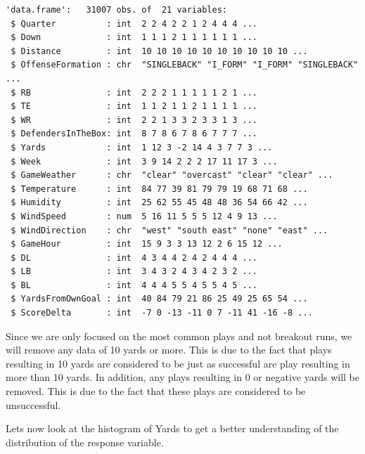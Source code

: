 \documentclass[
  super,
  preprint,
  3p]{elsarticle}
\newenvironment{Shaded}{\begin{snugshade}}{\end{snugshade}}
\newcommand{\CommentTok}[1]{\textcolor[rgb]{0.37,0.37,0.37}{#1}}
\newcommand{\DecValTok}[1]{\textcolor[rgb]{0.68,0.00,0.00}{#1}}
\newcommand{\NormalTok}[1]{\textcolor[rgb]{0.00,0.23,0.31}{#1}}
\newcommand{\OtherTok}[1]{\textcolor[rgb]{0.00,0.23,0.31}{#1}}
\newcommand{\SpecialCharTok}[1]{\textcolor[rgb]{0.37,0.37,0.37}{#1}}
\begin{document}
\begin{verbatim}
'data.frame':   31007 obs. of  21 variables:
 $ Quarter          : int  2 2 4 2 2 1 2 4 4 4 ...
 $ Down             : int  1 1 1 2 1 1 1 1 1 1 ...
 $ Distance         : int  10 10 10 10 10 10 10 10 10 10 ...
 $ OffenseFormation : chr  "SINGLEBACK" "I_FORM" "I_FORM" "SINGLEBACK" ...
 $ RB               : int  2 2 2 1 1 1 1 1 2 1 ...
 $ TE               : int  1 1 2 1 1 2 1 1 1 1 ...
 $ WR               : int  2 2 1 3 3 2 3 3 1 3 ...
 $ DefendersInTheBox: int  8 7 8 6 7 8 6 7 7 7 ...
 $ Yards            : int  1 12 3 -2 14 4 3 7 7 3 ...
 $ Week             : int  3 9 14 2 2 2 17 11 17 3 ...
 $ GameWeather      : chr  "clear" "overcast" "clear" "clear" ...
 $ Temperature      : int  84 77 39 81 79 79 19 68 71 68 ...
 $ Humidity         : int  25 62 55 45 48 48 36 54 66 42 ...
 $ WindSpeed        : num  5 16 11 5 5 5 12 4 9 13 ...
 $ WindDirection    : chr  "west" "south east" "none" "east" ...
 $ GameHour         : int  15 9 3 3 13 12 2 6 15 12 ...
 $ DL               : int  4 3 4 4 2 4 2 4 4 4 ...
 $ LB               : int  3 4 3 2 4 3 4 2 3 2 ...
 $ BL               : int  4 4 4 5 5 4 5 5 4 5 ...
 $ YardsFromOwnGoal : int  40 84 79 21 86 25 49 25 65 54 ...
 $ ScoreDelta       : int  -7 0 -13 -11 0 7 -11 41 -16 -8 ...
\end{verbatim}

Since we are only focused on the most common plays and not breakout
runs, we will remove any data of 10 yards or more. This is due to the
fact that plays resulting in 10 yards are considered to be just as
successful are play resulting in more than 10 yards. In addition, any
plays resulting in 0 or negative yards will be removed. This is due to
the fact that these plays are considered to be unsuccessful.

\begin{Shaded}
\end{Shaded}

Lets now look at the histogram of Yards to get a better understanding of
the distribution of the response variable.
\end{document}
